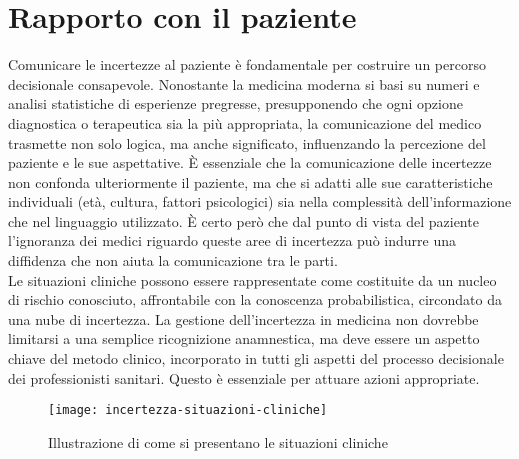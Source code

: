 \section{Rapporto con il paziente}

Comunicare le incertezze al paziente è fondamentale per costruire un percorso decisionale consapevole. Nonostante la medicina moderna si basi su numeri e analisi statistiche di  esperienze pregresse, presupponendo che ogni opzione diagnostica o terapeutica sia la più appropriata, la comunicazione del medico trasmette non solo logica, ma anche significato, influenzando la percezione del paziente e le sue aspettative. È essenziale che la comunicazione delle incertezze non confonda ulteriormente il paziente, ma che si adatti alle sue caratteristiche individuali (età, cultura, fattori psicologici) sia nella complessità dell'informazione che nel linguaggio utilizzato. È certo però che dal punto di vista del paziente l'ignoranza dei medici riguardo queste aree di incertezza può indurre una diffidenza che non aiuta la comunicazione tra le parti. \\

Le situazioni cliniche possono essere rappresentate come costituite da un nucleo di rischio conosciuto, affrontabile con la conoscenza probabilistica, circondato da una nube di incertezza. La gestione dell'incertezza in medicina non dovrebbe limitarsi a una semplice ricognizione anamnestica, ma deve essere un aspetto chiave del metodo clinico, incorporato in tutti gli aspetti del processo decisionale dei professionisti sanitari. Questo è essenziale per attuare azioni appropriate.\\

\begin{figure}[!ht] 
    \centering 
    \texttt{[image: incertezza-situazioni-cliniche]} 
    \caption{Illustrazione di come si presentano le situazioni cliniche}
\end{figure}


